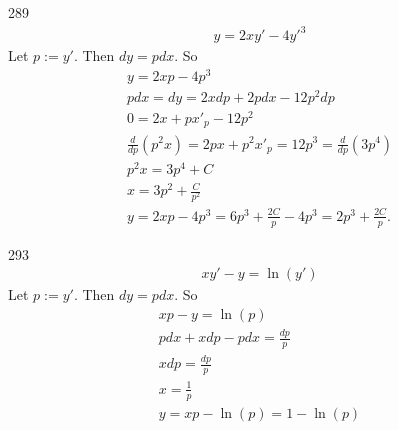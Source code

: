 \documentclass[12pt,a4paper]{article}
\begin{document}
    \begin{problem}{289}
        \begin{gather*}
            y = 2xy' - 4y'^3
        \end{gather*}
        Let $p := y'$. Then $dy = p dx$. So
        \begin{gather*}
            y = 2xp - 4p^3\\
            pdx = dy = 2xdp + 2pdx - 12p^2dp\\
            0 = 2x + px'_p - 12p^2\\
            \frac{d}{dp}(p^2x) = 2px + p^2 x'_p = 12p^3 = \frac{d}{dp}(3p^4)\\
            p^2 x = 3 p^4 + C\\
            x = 3p^2 + \frac{C}{p^2}\\
            y = 2xp - 4p^3 = 6p^3 + \frac{2C}{p} - 4p^3 = 2p^3 + \frac{2C}{p}.
        \end{gather*}
    \end{problem}

    \begin{problem}{293}
        \begin{gather*}
            xy' - y = \ln(y')
        \end{gather*}
        Let $p := y'$. Then $dy = pdx$. So
        \begin{gather*}
            xp - y = \ln(p)\\
            pdx + xdp - pdx = \frac{dp}{p}\\
            xdp = \frac{dp}{p}\\
            x = \frac{1}{p}\\
            y = xp - \ln(p) = 1 - \ln(p)
        \end{gather*}
    \end{problem}
\end{document}

